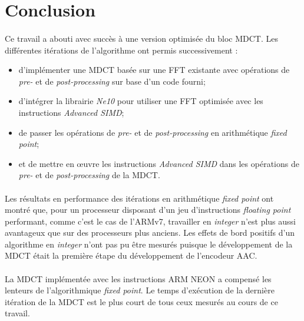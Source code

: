 \documentclass{article}
\begin{document}
    \newpage
    \section*{Conclusion}
    \paragraph{}
    Ce travail a abouti avec succès à une version optimisée du bloc MDCT. Les différentes itérations de l'algorithme ont permis successivement :
    \begin{itemize}
        \item d'implémenter une MDCT basée sur une FFT existante avec opérations de \emph{pre-} et de \emph{post-processing} sur base d'un code fourni;
        \item d'intégrer la librairie \emph{Ne10} pour utiliser une FFT optimisée avec les instructions \emph{Advanced SIMD};
        \item de passer les opérations de \emph{pre-} et de \emph{post-processing} en arithmétique \emph{fixed point};
        \item et de mettre en \oe uvre les instructions \emph{Advanced SIMD} dans les opérations de \emph{pre-} et de \emph{post-processing} de la MDCT.
    \end{itemize}

    \paragraph{}
    Les résultats en performance des itérations en arithmétique \emph{fixed point} ont montré que, pour un processeur disposant d'un jeu d'instructions \emph{floating point} performant, comme c'est le cas de l'ARMv7, travailler en \emph{integer} n'est plus aussi avantageux que sur des processeurs plus anciens. Les effets de bord positifs d'un algorithme en \emph{integer} n'ont pas pu être mesurés puisque le développement de la MDCT était la première étape du développement de l'encodeur AAC.

    \paragraph{}
    La MDCT implémentée avec les instructions ARM NEON a compensé les lenteurs de l'algorithmique \emph{fixed point}. Le temps d'exécution de la dernière itération de la MDCT est le plus court de tous ceux mesurés au cours de ce travail.
\end{document}
